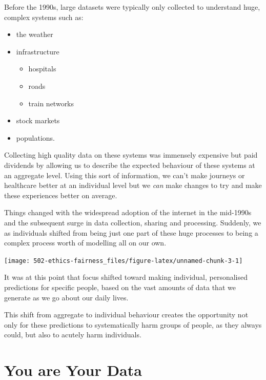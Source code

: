 \documentclass[
  12pt,
]{book}
\providecommand{\tightlist}{%
  \setlength{\itemsep}{0pt}\setlength{\parskip}{0pt}}
\begin{document}
Before the 1990s, large datasets were typically only collected to understand huge, complex systems such as:

\begin{itemize}
\tightlist
\item
  the weather
\item
  infrastructure

  \begin{itemize}
  \tightlist
  \item
    hospitals
  \item
    roads
  \item
    train networks
  \end{itemize}
\item
  stock markets
\item
  populations.
\end{itemize}

Collecting high quality data on these systems was immensely expensive but paid dividends by allowing us to describe the expected behaviour of these systems at an aggregate level. Using this sort of information, we can't make journeys or healthcare better at an individual level but we \emph{can} make changes to try and make these experiences better on average.

Things changed with the widespread adoption of the internet in the mid-1990s and the subsequent surge in data collection, sharing and processing. Suddenly, we as individuals shifted from being just one part of these huge processes to being a complex process worth of modelling all on our own.

\begin{center}\texttt{[image: 502-ethics-fairness\_files/figure-latex/unnamed-chunk-3-1]} \end{center}

It was at this point that focus shifted toward making individual, personalised predictions for specific people, based on the vast amounts of data that we generate as we go about our daily lives.

This shift from aggregate to individual behaviour creates the opportunity not only for these predictions to systematically harm groups of people, as they always could, but also to acutely harm individuals.

\hypertarget{you-are-your-data}{%
\section{You are Your Data}\label{you-are-your-data}}
\end{document}
